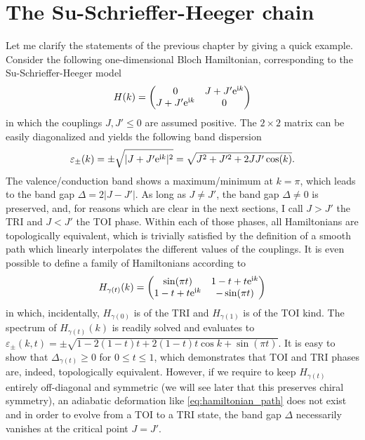 \section{The Su-Schrieffer-Heeger chain}
\label{sec:the_SSH_chain}
%
%
Let me clarify the statements of the previous chapter by giving a quick example.
Consider the following one-dimensional Bloch Hamiltonian, corresponding to the Su-Schrieffer-Heeger model
\begin{align}
    H(k)
    =
    \begin{pmatrix}
        0 & J+J'\mathrm e^{\mathrm i k}\\
        J+J'\mathrm e^{\mathrm i k} & 0
    \end{pmatrix}
\end{align}
in which the couplings $J,J'\leq0$ are assumed positive.
The $2\times2$ matrix can be easily diagonalized and yields the following band dispersion
\begin{align}
    \varepsilon_{\pm}(k) = \pm \sqrt{|J+J'\mathrm e^{\mathrm i k}|^2} = \sqrt{J^2+J'^2+2JJ'\cos(k)}.
\end{align}
The valence/conduction band shows a maximum/minimum at $k=\pi$, which leads to the band gap $\Delta = 2\left|J-J'\right|$.
As long as $J\neq J'$, the band gap $\Delta\neq0$ is preserved, and, for reasons which are clear in the next sections, I call $J>J'$ the TRI and $J<J'$ the TOI phase.
Within each of those phases, all Hamiltonians are topologically equivalent, which is trivially satisfied by the definition of a smooth path which linearly interpolates the different values of the couplings.
It is even possible to define a family of Hamiltonians according to
\begin{align}
    H_{\gamma(t)}(k) =
    \begin{pmatrix}
        \sin(\pi t) & 1-t + t\mathrm e^{\mathrm i k} \\
        1-t + t\mathrm e^{\mathrm i k} & -\sin(\pi t)
    \end{pmatrix}
    \label{eq:hamiltonian_path}
\end{align}
in which, incidentally, $H_{\gamma(0)}$ is of the TRI and $H_{\gamma(1)}$ is of the TOI kind.
The spectrum of $H_{\gamma(t)}(k)$ is readily solved and evaluates to $\varepsilon_\pm(k,t)=\pm\sqrt{1-2(1-t)t+2(1-t)t\cos k+\sin(\pi t)}$.
It is easy to show that $\Delta_{\gamma(t)}\geq0$ for $0\leq t\leq1$, which demonstrates that TOI and TRI phases are, indeed, topologically equivalent.
However, if we require to keep $H_{\gamma(t)}$ entirely off-diagonal and symmetric (we will see later that this preserves chiral symmetry), an adiabatic deformation like \cref{eq:hamiltonian_path} does not exist and in order to evolve from a TOI to a TRI state, the band gap $\Delta$ necessarily vanishes at the critical point $J=J'$.

